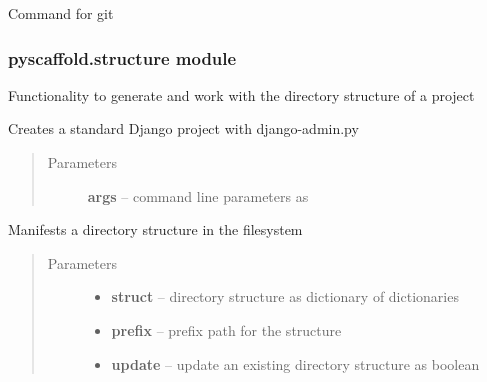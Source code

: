 \documentclass[letterpaper,10pt,english]{sphinxmanual}
\begin{document}
\begin{fulllineitems}
\label{_rst/pyscaffold:pyscaffold.shell.git}
Command for git

\end{fulllineitems}



\subsubsection{pyscaffold.structure module}
\label{_rst/pyscaffold:module-pyscaffold.structure}\label{_rst/pyscaffold:pyscaffold-structure-module}
Functionality to generate and work with the directory structure of a project

\begin{fulllineitems}
\label{_rst/pyscaffold:pyscaffold.structure.create_django_proj}
Creates a standard Django project with django-admin.py
\begin{quote}\begin{description}
\item[{Parameters}] \leavevmode
\textbf{args} -- command line parameters as \href{http://docs.python.org/2.7/library/argparse.html\#argparse.Namespace}{}

\end{description}\end{quote}

\end{fulllineitems}


\begin{fulllineitems}
\label{_rst/pyscaffold:pyscaffold.structure.create_structure}
Manifests a directory structure in the filesystem
\begin{quote}\begin{description}
\item[{Parameters}] \leavevmode\begin{itemize}
\item {} 
\textbf{struct} -- directory structure as dictionary of dictionaries

\item {} 
\textbf{prefix} -- prefix path for the structure

\item {} 
\textbf{update} -- update an existing directory structure as boolean

\end{itemize}

\end{description}\end{quote}

\end{fulllineitems}
\end{document}
